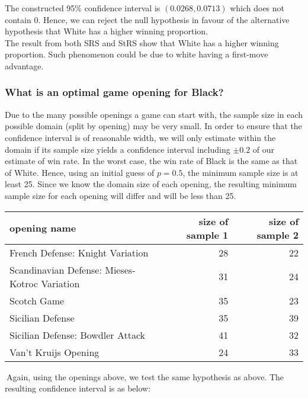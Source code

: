 \documentclass[11pt,]{article}
\begin{document}
The constructed 95\% confidence interval is \((0.0268, 0.0713)\) which
does not contain 0. Hence, we can reject the null hypothesis in favour
of the alternative hypothesis that White has a higher winning
proportion.\\
\newline The result from both SRS and StRS show that White has a higher
winning proportion. Such phenomenon could be due to white having a
first-move advantage. \newpage

\hypertarget{what-is-an-optimal-game-opening-for-black}{%
\subsubsection{\texorpdfstring{\textbf{What is an optimal game opening
for
Black?}}{What is an optimal game opening for Black?}}\label{what-is-an-optimal-game-opening-for-black}}

Due to the many possible openings a game can start with, the sample size
in each possible domain (split by opening) may be very small. In order
to ensure that the confidence interval is of reasonable width, we will
only estimate within the domain if its sample size yields a confidence
interval including \(\pm 0.2\) of our estimate of win rate. In the worst
case, the win rate of Black is the same as that of White. Hence, using
an initial guess of \(p=0.5\), the minimum sample size is at least 25.
Since we know the domain size of each opening, the resulting minimum
sample size for each opening will differ and will be less than 25.
\newline

\begin{tabular}{l|r|r}
\hline
opening name & size of sample 1 & size of sample 2\\
\hline
French Defense: Knight Variation & 28 & 22\\
\hline
Scandinavian Defense: Mieses-Kotroc Variation & 31 & 24\\
\hline
Scotch Game & 35 & 23\\
\hline
Sicilian Defense & 35 & 39\\
\hline
Sicilian Defense: Bowdler Attack & 41 & 32\\
\hline
Van't Kruijs Opening & 24 & 33\\
\hline
\end{tabular}

\(~\)\newline Again, using the openings above, we test the same
hypothesis as above. The resulting confidence interval is as below:
\end{document}
